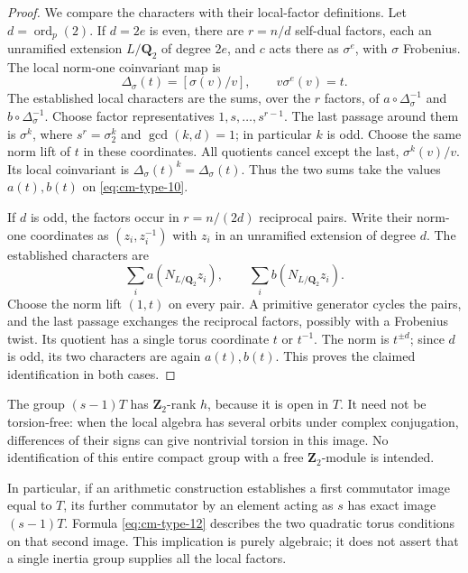 \begin{proof}
We compare the characters with their local-factor definitions.
Let \(d=\operatorname{ord}_p(2)\). If \(d=2e\) is even,
there are \(r=n/d\) self-dual factors, each an unramified
extension \(L/\mathbf Q_2\) of degree \(2e\), and
\(c\) acts there as \(\sigma^e\), with \(\sigma\) Frobenius.
The local norm-one coinvariant map is
\[
 \Delta_{\sigma}(t)=[\sigma(v)/v],\qquad v\sigma^e(v)=t.
\]
The established local characters are the sums, over the \(r\)
factors, of \(a\circ\Delta_{\sigma}^{-1}\) and
\(b\circ\Delta_{\sigma}^{-1}\). Choose factor representatives
\(1,s,\ldots,s^{r-1}\). The last passage around them is
\(\sigma^k\), where \(s^r=\sigma_2^k\) and
\(\gcd(k,d)=1\); in particular \(k\) is odd. Choose the same
norm lift of \(t\) in these coordinates. All quotients cancel
except the last, \(\sigma^k(v)/v\). Its local coinvariant is
\(\Delta_{\sigma}(t)^k=\Delta_{\sigma}(t)\). Thus the two
sums take the values \(a(t),b(t)\) on \eqref{eq:cm-type-10}.

If \(d\) is odd, the factors occur in \(r=n/(2d)\) reciprocal
pairs. Write their norm-one coordinates as \((z_i,z_i^{-1})\)
with \(z_i\) in an unramified extension of degree \(d\).
The established characters are
\[
        \sum_i a(N_{L/\mathbf Q_2}z_i),\qquad
        \sum_i b(N_{L/\mathbf Q_2}z_i).
\]
Choose the norm lift \((1,t)\) on every pair. A primitive
generator cycles the pairs, and the last passage exchanges
the reciprocal factors, possibly with a Frobenius twist.
Its quotient has a single torus coordinate \(t\) or \(t^{-1}\).
The norm is \(t^{\pm d}\); since \(d\) is odd, its two
characters are again \(a(t),b(t)\). This proves the claimed
identification in both cases.
\end{proof}

The group \((s-1)T\) has \(\mathbf Z_2\)-rank \(h\), because
it is open in \(T\). It need not be torsion-free: when the local
algebra has several orbits under complex conjugation, differences
of their signs can give nontrivial torsion in this image. No
identification of this entire compact group with a free
\(\mathbf Z_2\)-module is intended.

In particular, if an arithmetic construction establishes a first
commutator image equal to \(T\), its further commutator by an
element acting as \(s\) has exact image \((s-1)T\). Formula
\eqref{eq:cm-type-12} describes the two quadratic torus conditions on that
second image. This implication is purely algebraic; it does not
assert that a single inertia group supplies all the local factors.

